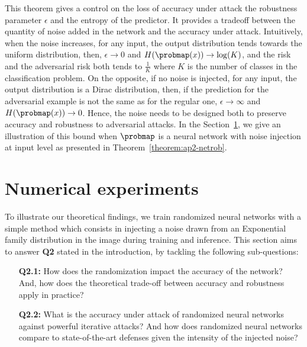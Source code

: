 This theorem gives a control on the loss of accuracy under attack \wrt the robustness parameter $\epsilon$ and the entropy of the predictor.
It provides a tradeoff between the quantity of noise added in the network and the accuracy under attack.
Intuitively, when the noise increases, for any input, the output distribution tends towards the uniform distribution, then, $\epsilon\rightarrow0$ and $H(\probmap(x))\rightarrow \log(K)$, and the risk and the adversarial risk both tends to $\frac{1}{K}$ where $K$ is the number of classes in the classification problem.
On the opposite, if no noise is injected, for any input, the output distribution is a  Dirac distribution, then, if the prediction for the adversarial example is not the same as for the regular one, $\epsilon\rightarrow\infty$ and $H(\probmap(x))\rightarrow 0$.
Hence, the noise needs to be designed both to preserve accuracy and robustness to adversarial attacks.
In the Section~\ref{section:ap2-experiment}, we give an illustration of this bound when $\probmap$ is a neural network with noise injection at input level as presented in Theorem~\ref{theorem:ap2-netrob}.

\section{Numerical experiments}
\label{section:ap2-experiment}

To illustrate our theoretical findings, we train randomized neural networks with a simple method which consists in injecting a noise drawn from an Exponential family distribution in the image during training and inference.
This section aims to answer \textbf{Q2} stated in the introduction, by tackling the following sub-questions:
\begin{itemize}
  \item[\textbf{Q2.1:}] How does the randomization impact the accuracy of the network? And, how does the theoretical trade-off between accuracy and robustness apply in practice? 
  \item[\textbf{Q2.2:}] What is the accuracy under attack of randomized neural networks against powerful iterative attacks? And how does randomized neural networks compare to state-of-the-art defenses given the intensity of the injected noise? 
\end{itemize}

